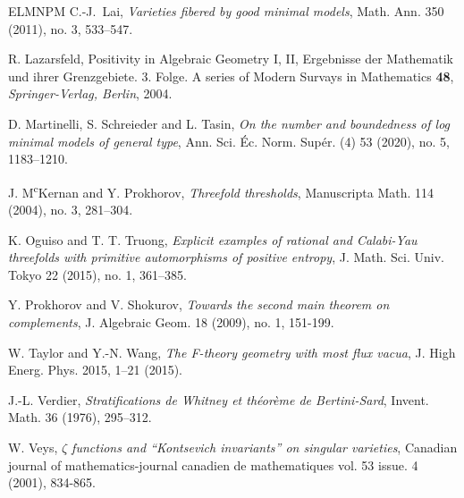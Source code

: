 \documentclass{amsart}[12pt,a4paper]
\theoremstyle{definition}
\begin{document}
\begin{thebibliography}{ELMNPM}
 C.-J.~Lai,  {\it Varieties fibered by good minimal models}, 
Math. Ann. 350 (2011), no. 3, 533--547.

 R. Lazarsfeld, Positivity in Algebraic Geometry I, II,
Ergebnisse der Mathematik und ihrer Grenzgebiete. 3. Folge. A series
of Modern Survays in Mathematics \textbf{48},
\textit{Springer-Verlag, Berlin}, 2004.

D. Martinelli, S. Schreieder and L. Tasin,
\textit{On the number and boundedness of log minimal models of general type}, Ann. Sci. \'Ec. Norm. Sup\'er. (4) 53 (2020), no. 5, 1183--1210.

J. M\textsuperscript{c}Kernan and Y. Prokhorov,
\textit{Threefold thresholds}, 
Manuscripta Math. 114 (2004), no. 3, 281--304. 

K. Oguiso and T. T. Truong,
\textit{Explicit examples of rational and {C}alabi-{Y}au threefolds with primitive automorphisms of positive entropy},
J. Math. Sci. Univ. Tokyo 22 (2015), no. 1, 361--385.

 Y. Prokhorov and V. Shokurov, \textit{Towards the second main theorem on complements},
J. Algebraic Geom. 18 (2009), no. 1, 151-199.

 W. Taylor and Y.-N. Wang, \textit{The F-theory geometry with most flux vacua}, J. High Energ. Phys. 2015, 1--21 (2015).

J.-L. Verdier, \textit{Stratifications de {W}hitney et th\'{e}or\`eme de {B}ertini-{S}ard}, Invent. Math. 36 (1976), 295--312.

 W. Veys, \textit{$\zeta$ functions and ``Kontsevich invariants'' on singular varieties}, 
Canadian journal of mathematics-journal canadien de mathematiques vol. 53 issue. 4 (2001), 834-865.

\end{thebibliography}

\end{document}
